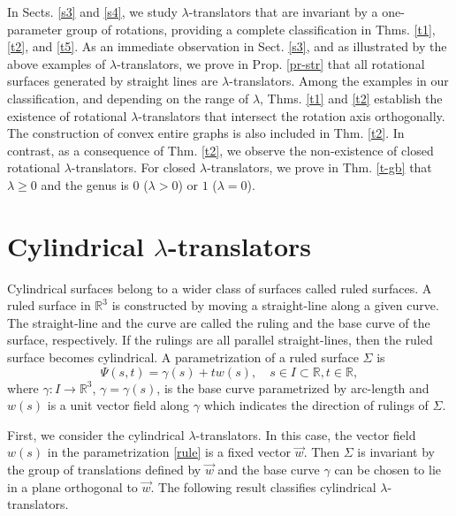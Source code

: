 \documentclass[12pt]{amsart}
\def\r{\mathbb R}
\theoremstyle{definition}
\begin{document}
In Sects. \ref{s3} and \ref{s4}, we study $\lambda$-translators that are invariant by a one-parameter group of rotations, providing a complete classification in Thms. \ref{t1}, \ref{t2}, and \ref{t5}. As an immediate observation in Sect. \ref{s3}, and as illustrated by the above examples of $\lambda$-translators, we prove in Prop. \ref{pr-str} that all rotational surfaces generated by straight lines are $\lambda$-translators. Among the examples in our classification, and depending on the range of $\lambda$, Thms. \ref{t1} and \ref{t2} establish the existence of rotational $\lambda$-translators that intersect the rotation axis orthogonally. The construction of convex entire graphs is also included in Thm. \ref{t2}. In contrast, as a consequence of Thm. \ref{t2}, we observe the non-existence of closed rotational $\lambda$-translators. 
For closed $\lambda$-translators, we prove in Thm. \ref{t-gb}   that $\lambda \geq 0$ and     the genus is $0$ ($\lambda>0$) or $1$ ($\lambda=0$).  

\section{Cylindrical $\lambda$-translators}\label{s2}

Cylindrical surfaces belong to a wider class of surfaces called ruled surfaces. A ruled surface in $\r^3$ is constructed by moving a straight-line along a given curve. The straight-line and the curve are called the ruling and the base curve of the surface, respectively.  If the rulings are all parallel straight-lines, then the ruled surface becomes cylindrical. A parametrization of a ruled surface $\Sigma$ is 
\begin{equation}
\Psi(s,t)=\gamma(s)+tw(s), \quad s\in I \subset \r,t\in\r, \label{rule}
\end{equation}
where $ \gamma \colon I \to \mathbb{R}^3$,  $\gamma = \gamma(s)$, is the base curve parametrized by arc-length and
$w(s)$ is a unit vector field along $\gamma$ which indicates  the direction of rulings of $\Sigma$.  



First, we consider the cylindrical $\lambda$-translators.  In this case, the vector field $w(s)$ in the parametrization \eqref{rule} is a fixed vector $\vec{w}$. Then $\Sigma$ is invariant by the group of translations defined by $\vec{w}$ and   the base curve $\gamma$ can be chosen to lie in a plane orthogonal to $\vec{w}$. The following result classifies cylindrical $\lambda$-translators.
\end{document}
